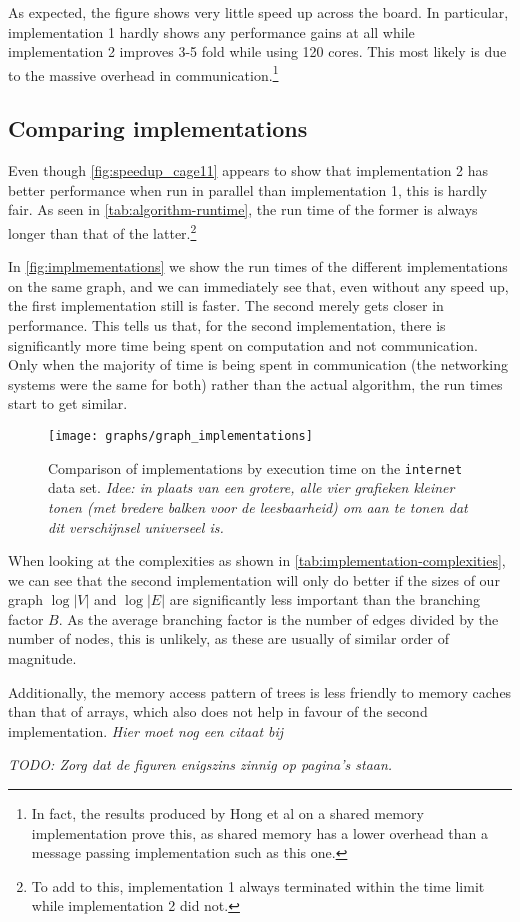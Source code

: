 As expected, the figure shows very little speed up across the board. In particular, implementation 1 hardly shows any performance gains at all while implementation 2 improves 3-5 fold while using 120 cores. This most likely is due to the massive overhead in communication.\footnote{In fact, the results produced by Hong et al \cite{LockFreeMultithreadedMaxFlow} on a shared memory implementation prove this, as shared memory has a lower overhead than a message passing implementation such as this one.}

\subsection{Comparing implementations}
Even though \autoref{fig:speedup_cage11} appears to show that implementation 2 has better performance when run in parallel than implementation 1, this is hardly fair. As seen in \autoref{tab:algorithm-runtime}, the run time of the former is always longer than that of the latter.\footnote{To add to this, implementation 1 always terminated within the time limit while implementation 2 did not.}

In \autoref{fig:implmementations} we show the run times of the different implementations on the same graph, and we can immediately see that, even without any speed up, the first implementation still is faster. The second merely gets closer in performance. This tells us that, for the second implementation, there is significantly more time being spent on computation and not communication. Only when the majority of time is being spent in communication (the networking systems were the same for both) rather than the actual algorithm, the run times start to get similar.

\begin{figure}[b!]
	\centering
  \texttt{[image: graphs/graph\_implementations]}
  \caption{Comparison of implementations by execution time on the \texttt{internet} data set. \emph{Idee: in plaats van een grotere, alle vier grafieken kleiner tonen (met bredere balken voor de leesbaarheid) om aan te tonen dat dit verschijnsel universeel is.}}
  \label{fig:implmementations}
\end{figure}

When looking at the complexities as shown in \autoref{tab:implementation-complexities}, we can see that the second implementation will only do better if the sizes of our graph $\log |V|$ and $\log |E|$ are significantly less important than the branching factor $B$. As the average branching factor is the number of edges divided by the number of nodes, this is unlikely, as these are usually of similar order of magnitude.

Additionally, the memory access pattern of trees is less friendly to memory caches than that of arrays, which also does not help in favour of the second implementation. \emph{Hier moet nog een citaat bij}

\emph{TODO: Zorg dat de figuren enigszins zinnig op pagina's staan.}